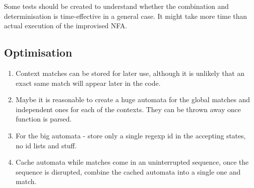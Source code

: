 Some tests should be created to understand whether the combination and determinisation is time-effective in a general case. It might take more time than actual execution of the improvised NFA.

\subsection{Optimisation}
\begin{enumerate}
\item Context matches can be stored for later use, although it is unlikely that an exact same match will appear later in the code.
\item Maybe it is reasonable to create a huge automata for the global matches and independent ones for each of the contexts. They can be thrown away once function is parsed.
\item For the big automata - store only a single regexp id in the accepting states, no id lists and stuff.
\item Cache automata while matches come in an uninterrupted sequence, once the sequence is disrupted, combine the cached automata into a single one and match.
\end{enumerate}
